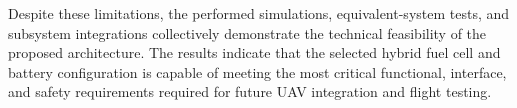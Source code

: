 Despite these limitations, the performed simulations, equivalent-system tests, and subsystem integrations collectively demonstrate the technical feasibility of the proposed architecture. The results indicate that the selected hybrid fuel cell and battery configuration is capable of meeting the most critical functional, interface, and safety requirements required for future UAV integration and flight testing.


\REQvtable%

